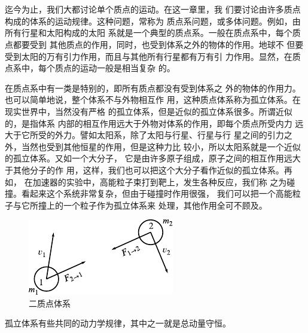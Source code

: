 \section[动量守恒]{}\label{sec:08.01}

迄今为止，我们大都讨论单个质点的运动。在这一章里，我
们要讨论由许多质点构成的体系的运动规律。这种问题，常称为
质点系问题，或多体问题。例如，由所有行星和太阳构成的太阳
系就是一个典型的质点系。一般在质点系中，每个质点都要受到
其他质点的作用，同时，也受到体系之外的物体的作用。地球不
但要受到太阳的万有引力作用，而且与其他所有行星都有万有引
力作用。显然，在质点系中，每个质点的运动一般是相当复杂
的。

在质点系中有一类是特别的，即所有质点都没有受到体系之
外的物体的作用力。也可以简单地说，整个体系不与外物相互作
用，这种质点体系称为孤立体系。在现实世界中，当然没有严格
的孤立体系，但是近似的孤立体系很多。所谓近似的，是指体系
内部的相互作用远大于外物对体系的作用，即每个质点所受内力
远大于它所受的外力。譬如太阳系，除了太阳与行星、行星与行
星之间的引力之外，当然也受到其他恒星的作用，但是这种力比
较小，所以太阳系就是一个近似的孤立体系。又如一个大分子，
它是由许多原子组成，原子之间的相互作用远大于其他分子的作
用，这样，我们也可以把这个大分子看作近似的孤立体系。再如，
在加速器的实验中，高能粒子束打到靶上，发生各种反应，我们称
\clearpage\noindent
之为碰撞。看起来这个系统非常复杂，但由于碰撞时作用很强，
我们可以把一个高能粒子与它所撞上的一个粒子作为孤立体系来
处理，其他作用全可不顾及。

\begin{figure}
  \vspace{-1.5em}
  \centering
  \includegraphics{figure/fig08.01}
  \caption{二质点体系}
  \label{fig:08.01}
\end{figure}
孤立体系有些共同的动力学规律，其中之一就是总动量守恒。

